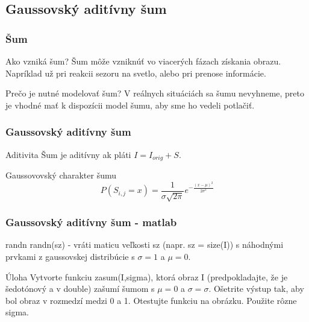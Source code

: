 \documentclass{beamer}
\begin{document}
\subsection{Gaussovský aditívny šum}
\begin{frame}
\frametitle{Šum}
\begin{block}{Ako vzniká šum?}
Šum môže vzniknúť vo viacerých fázach získania obrazu. Napríklad už pri reakcii sezoru na svetlo, alebo pri prenose informácie. 
\end{block}

\begin{block}{Prečo je nutné modelovať šum?}
V reálnych situáciách sa šumu nevyhneme, preto je vhodné mať k dispozícii model šumu, aby sme ho vedeli potlačiť.
\end{block}
\end{frame}

\begin{frame}
\frametitle{Gaussovský aditívny šum}
\begin{block}{Aditivita}
Šum je aditívny ak pláti $I = I_{orig} + S$.
\end{block}

\begin{block}{Gaussovovský charakter šumu}
\begin{equation}
P(S_{i,j} = x) = \frac{1}{\sigma \sqrt{2\pi}} e^{-\frac{(x-\mu)^2}{2\sigma^2}}
\end{equation}
\end{block}

\noindent{}
\end{frame}

\begin{frame}
\frametitle{Gaussovský aditívny šum - matlab}
\begin{block}{randn}
randn(sz) - vráti maticu veľkosti sz (napr. sz = size(I)) s náhodnými prvkami z gaussovskej distribúcie s $\sigma = 1$ a $\mu = 0$.
\end{block}

\begin{block}{Úloha}
Vytvorte funkciu zasum(I,sigma), ktorá obraz I (predpokladajte, že je šedotónový a v double) zašumí šumom s $\mu = 0$ a $\sigma = \sigma$. Ošetrite výstup tak, aby bol obraz v rozmedzí medzi 0 a 1. Otestujte funkciu na obrázku. Použite rôzne sigma.
\end{block}
\end{frame}
\end{document}
